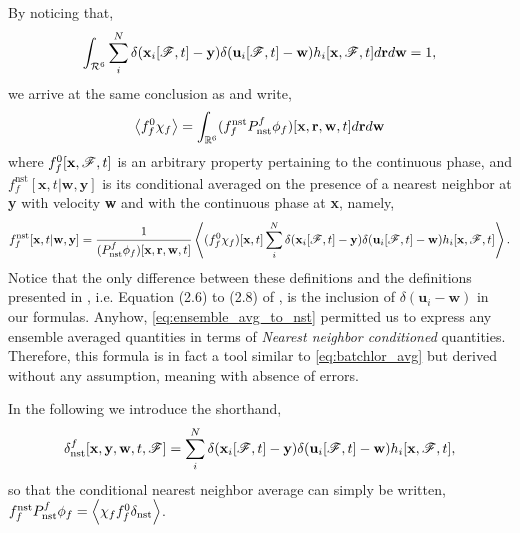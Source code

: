 By noticing that, 
\begin{equation}
    \int_{\mathcal{R}^6}
    \sum_i^N 
    \delta(\textbf{x}_i[\mathscr{F},t]-\textbf{y})
    \delta(\textbf{u}_i[\mathscr{F},t]-\textbf{w})
    h_i[\textbf{x},\mathscr{F},t]
    d\textbf{r}
    d\textbf{w} 
    =1,
\end{equation}
we arrive at the same conclusion as \citet{zhang2021ensemble} and write, 
\begin{equation}
    \avg{f_f^0\chi_f}
    = 
    \int_{\mathbb{R}^6}
    (f_f^\text{nst}P_\text{nst}^f\phi_f)[\textbf{x},\textbf{r},\textbf{w},t]
    d\textbf{r}
    d\textbf{w}
    \label{eq:ensemble_avg_to_nst}
\end{equation} 
where $f_f^0[\textbf{x},\mathscr{F},t]$ is an arbitrary property pertaining to the continuous phase, and $f_f^\text{nst}[\textbf{x},t|\textbf{w},\textbf{y}]$ is its conditional averaged on the presence of a nearest neighbor at \textbf{y} with velocity \textbf{w} and with the continuous phase at \textbf{x}, namely, 
\begin{equation}
    f_f^\text{nst}[\textbf{x},t|\textbf{w},\textbf{y}]
    =\frac{1}{(P_\text{nst}^f\phi_f) [\textbf{x},\textbf{r},\textbf{w},t]}
    \avg{
        (f_f^0
        \chi_f)[\textbf{x},t]
        \sum_i^N 
        \delta(\textbf{x}_i[\FF,t]-\textbf{y})
        \delta(\textbf{u}_i[\FF,t]-\textbf{w})
        h_i[\textbf{x},\FF,t]
    }.
    \label{eq:def_f_nst}
\end{equation}
Notice that the only difference between these definitions and the definitions presented in \citet{zhang2021ensemble}, i.e. Equation (2.6) to (2.8) of \citet{zhang2021ensemble}, is the inclusion of $\delta(\textbf{u}_i - \textbf{w})$ in our formulas. 
Anyhow, \ref{eq:ensemble_avg_to_nst} permitted us to express any ensemble averaged quantities in terms of \textit{Nearest neighbor conditioned} quantities. 
Therefore, this formula is in fact a tool similar to \ref{eq:batchlor_avg} but derived without any assumption, meaning with absence of errors. 

In the following we introduce the shorthand, 
\begin{equation*}
    \delta_\text{nst}^f [\textbf{x},\textbf{y},\textbf{w},t,\mathscr{F}]
    =
    \sum_i^N 
    \delta(\textbf{x}_i[\mathscr{F},t]-\textbf{y})
    \delta(\textbf{u}_i[\mathscr{F},t]-\textbf{w})
    h_i[\textbf{x},\mathscr{F},t],
\end{equation*}
so that the conditional nearest neighbor average can simply be written, $f_f^\text{nst} P_\text{nst}^f \phi_f = \left<\chi_f f_f^0 \delta_\text{nst}\right>$.

